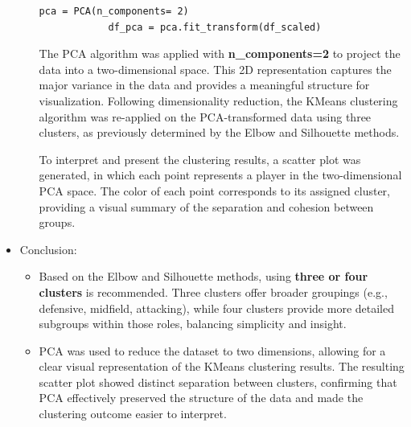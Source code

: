\documentclass[a4paper,12pt]{article}
\begin{document}
\begin{itemize}[label= {*}, leftmargin= 1cm]
\begin{itemize}[label= {}, leftmargin= 1cm]
        \begin{Verbatim}[xleftmargin= -1cm]
            pca = PCA(n_components= 2)
            df_pca = pca.fit_transform(df_scaled)
        \end{Verbatim}
        \vspace{0.3cm}

        The PCA algorithm was applied with \textbf{n\_components=2} to project the data into a two-dimensional space. This 2D representation captures the major variance in the data and provides a meaningful structure for visualization. Following dimensionality reduction, the KMeans clustering algorithm was re-applied on the PCA-transformed data using three clusters, as previously determined by the Elbow and Silhouette methods.
        \vspace{0.3cm}

        To interpret and present the clustering results, a scatter plot was generated, in which each point represents a player in the two-dimensional PCA space. The color of each point corresponds to its assigned cluster, providing a visual summary of the separation and cohesion between groups. 
        \vspace{0.3cm}
        
    \end{itemize}
    \item {\Large Conclusion:}
    \begin{itemize}[label= {-}, leftmargin= 1cm]
        \item Based on the Elbow and Silhouette methods, using \textbf{three or four clusters }is recommended. Three clusters offer broader groupings (e.g., defensive, midfield, attacking), while four clusters provide more detailed subgroups within those roles, balancing simplicity and insight.
        \item PCA was used to reduce the dataset to two dimensions, allowing for a clear visual representation of the KMeans clustering results. The resulting scatter plot showed distinct separation between clusters, confirming that PCA effectively preserved the structure of the data and made the clustering outcome easier to interpret.
    \end{itemize}
    \newpage


\end{itemize}
\end{document}
